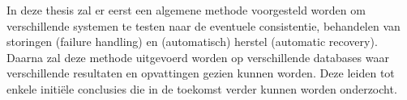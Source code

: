 In deze thesis zal er eerst een algemene methode voorgesteld worden om verschillende systemen te testen naar de eventuele consistentie, behandelen van storingen (failure handling) en (automatisch) herstel (automatic recovery).  \\
Daarna zal deze methode uitgevoerd worden op verschillende databases waar verschillende resultaten en opvattingen gezien kunnen worden. Deze leiden tot enkele initiële conclusies die in de toekomst verder kunnen worden onderzocht. 